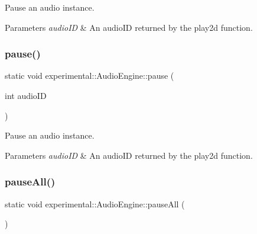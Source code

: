 Pause an audio instance.


\begin{DoxyParams}{Parameters}
{\em audio\+ID} & An audio\+ID returned by the play2d function. \\
\hline
\end{DoxyParams}
\mbox{\label{classexperimental_1_1AudioEngine_a1989c81a914d8f927c4f2decfacd3a96}} 
\subsubsection{\texorpdfstring{pause()}{pause()}\hspace{0.1cm}{\footnotesize\ttfamily [2/2]}}
{\footnotesize\ttfamily static void experimental\+::\+Audio\+Engine\+::pause (\begin{DoxyParamCaption}\item[{int}]{audio\+ID }\end{DoxyParamCaption})\hspace{0.3cm}{\ttfamily [static]}}

Pause an audio instance.


\begin{DoxyParams}{Parameters}
{\em audio\+ID} & An audio\+ID returned by the play2d function. \\
\hline
\end{DoxyParams}
\mbox{\label{classexperimental_1_1AudioEngine_a3d08304458bf45967020a9ab00e91eb3}} 
\subsubsection{\texorpdfstring{pause\+All()}{pauseAll()}\hspace{0.1cm}{\footnotesize\ttfamily [1/2]}}
{\footnotesize\ttfamily static void experimental\+::\+Audio\+Engine\+::pause\+All (\begin{DoxyParamCaption}{ }\end{DoxyParamCaption})\hspace{0.3cm}{\ttfamily [static]}}

